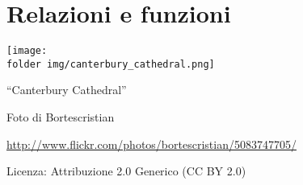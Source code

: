 \part{Relazioni e funzioni}
\texttt{[image: \\folder img/canterbury\_cathedral.png]}
 \begin{center}
 {\large ``Canterbury Cathedral''}
 \par
 Foto di Bortescristian
 \par
 \url{http://www.flickr.com/photos/bortescristian/5083747705/}\par
 Licenza: Attribuzione 2.0 Generico (CC BY 2.0)\par
 \end{center}
\clearpage
\cleardoublepage
